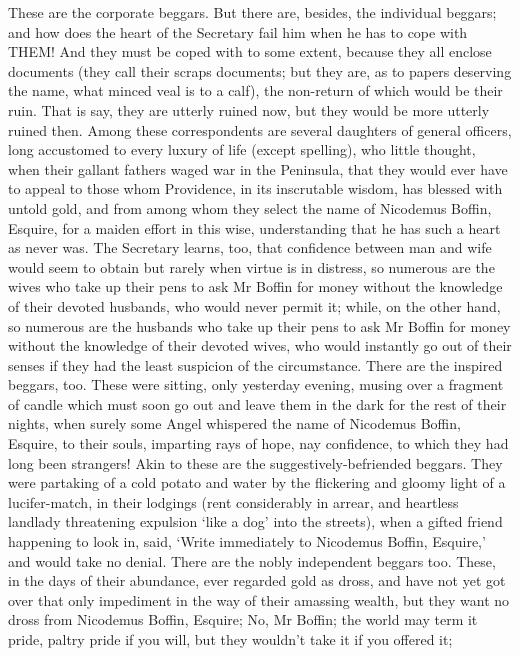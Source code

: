 These are the corporate beggars. But there are, besides, the individual
beggars; and how does the heart of the Secretary fail him when he has to
cope with THEM! And they must be coped with to some extent, because they
all enclose documents (they call their scraps documents; but they are,
as to papers deserving the name, what minced veal is to a calf), the
non-return of which would be their ruin. That is say, they are utterly
ruined now, but they would be more utterly ruined then. Among these
correspondents are several daughters of general officers, long
accustomed to every luxury of life (except spelling), who little
thought, when their gallant fathers waged war in the Peninsula,
that they would ever have to appeal to those whom Providence, in its
inscrutable wisdom, has blessed with untold gold, and from among whom
they select the name of Nicodemus Boffin, Esquire, for a maiden effort
in this wise, understanding that he has such a heart as never was. The
Secretary learns, too, that confidence between man and wife would seem
to obtain but rarely when virtue is in distress, so numerous are the
wives who take up their pens to ask Mr Boffin for money without the
knowledge of their devoted husbands, who would never permit it; while,
on the other hand, so numerous are the husbands who take up their pens
to ask Mr Boffin for money without the knowledge of their devoted
wives, who would instantly go out of their senses if they had the least
suspicion of the circumstance. There are the inspired beggars, too.
These were sitting, only yesterday evening, musing over a fragment of
candle which must soon go out and leave them in the dark for the rest
of their nights, when surely some Angel whispered the name of Nicodemus
Boffin, Esquire, to their souls, imparting rays of hope, nay
confidence, to which they had long been strangers! Akin to these are the
suggestively-befriended beggars. They were partaking of a cold potato
and water by the flickering and gloomy light of a lucifer-match, in
their lodgings (rent considerably in arrear, and heartless landlady
threatening expulsion ‘like a dog’ into the streets), when a gifted
friend happening to look in, said, ‘Write immediately to Nicodemus
Boffin, Esquire,’ and would take no denial. There are the nobly
independent beggars too. These, in the days of their abundance, ever
regarded gold as dross, and have not yet got over that only impediment
in the way of their amassing wealth, but they want no dross from
Nicodemus Boffin, Esquire; No, Mr Boffin; the world may term it pride,
paltry pride if you will, but they wouldn’t take it if you offered it;
